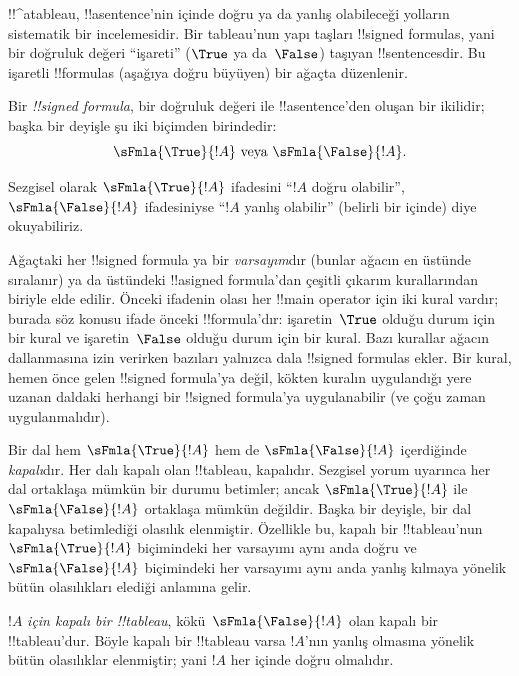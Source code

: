 \documentclass[../../../include/open-logic-section]{subfiles}
\begin{document}
      {}
      {}


!!^a{tableau}, !!a{sentence}'nin
 içinde doğru ya da yanlış
olabileceği yolların sistematik bir incelemesidir. Bir tableau'nun yapı
taşları !!{signed formula}s, yani bir doğruluk değeri ``işareti'' ($\True$
ya da~$\False$) taşıyan !!{sentence}s{}dir. Bu işaretli !!{formula}s (aşağıya
doğru büyüyen) bir ağaçta düzenlenir.

\begin{defn}
  Bir \emph{!!{signed formula}}, bir doğruluk değeri ile !!a{sentence}'den
  oluşan bir ikilidir; başka bir deyişle şu iki biçimden birindedir:
  \[
  \sFmla{\True}{!A} \text{ veya } \sFmla{\False}{!A}.
  \]
\end{defn}

Sezgisel olarak $\sFmla{\True}{!A}$ ifadesini ``$!A$ doğru olabilir'',
$\sFmla{\False}{!A}$ ifadesiniyse ``$!A$ yanlış olabilir'' (belirli bir
 içinde) diye okuyabiliriz.

Ağaçtaki her !!{signed formula} ya bir \emph{varsayım}dır (bunlar ağacın en
üstünde sıralanır) ya da üstündeki !!a{signed formula}'dan çeşitli çıkarım
kurallarından biriyle elde edilir. Önceki ifadenin olası her !!{main
operator} için iki kural vardır; burada söz konusu ifade önceki
!!{formula}'dır: işaretin~$\True$ olduğu durum için bir kural ve
işaretin~$\False$ olduğu durum için bir kural. Bazı kurallar
ağacın dallanmasına izin verirken bazıları yalnızca dala !!{signed formula}s
ekler. Bir kural, hemen önce gelen !!{signed formula}'ya değil, kökten
kuralın uygulandığı yere uzanan daldaki herhangi bir !!{signed formula}'ya
uygulanabilir (ve çoğu zaman uygulanmalıdır).

Bir dal hem $\sFmla{\True}{!A}$ hem de $\sFmla{\False}{!A}$ içerdiğinde
\emph{kapalı}dır. Her dalı kapalı olan !!{tableau}, kapalıdır. Sezgisel
yorum uyarınca her dal ortaklaşa mümkün bir durumu betimler; ancak
$\sFmla{\True}{!A}$ ile $\sFmla{\False}{!A}$ ortaklaşa mümkün değildir.
Başka bir deyişle, bir dal kapalıysa betimlediği olasılık elenmiştir.
Özellikle bu, kapalı bir !!{tableau}'nun $\sFmla{\True}{!A}$ biçimindeki her
varsayımı aynı anda doğru ve~$\sFmla{\False}{!A}$ biçimindeki her varsayımı
aynı anda yanlış kılmaya yönelik bütün olasılıkları elediği anlamına gelir.

$!A$ \emph{için kapalı bir !!{tableau}}, kökü~$\sFmla{\False}{!A}$ olan
kapalı bir !!{tableau}'dur. Böyle kapalı bir !!{tableau} varsa $!A$'nın
yanlış olmasına yönelik bütün olasılıklar elenmiştir; yani $!A$ her
 içinde doğru olmalıdır.
\end{document}
